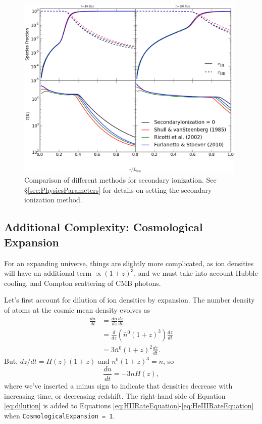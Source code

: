 \documentclass[letterpaper,titlepage,12pt]{article}
\numberwithin{equation}{section}
\begin{document}
\begin{figure}[htbp!]
\begin{center}
\includegraphics[width=0.98\textwidth]{figures/secondary_ionization_methods.eps}
\caption{Comparison of different methods for secondary ionization.  See \S\ref{sec:PhysicsParameters} for details on setting the secondary ionization method.}
\label{fig:SecondaryIonizationMethods}
\end{center}
\end{figure}

\subsection{Additional Complexity: Cosmological Expansion}
For an expanding universe, things are slightly more complicated, as ion densities will have an additional term $\propto (1 + z)^3$, and we must take into account Hubble cooling, and Compton scattering of CMB photons.

Let's first account for dilution of ion densities by expansion.  The number density of atoms at the cosmic mean density evolves as
\begin{align}
    \frac{dn}{dt} & = \frac{dn}{dz}\frac{dz}{dt} \nonumber \\
    & = \frac{d}{dz}\left(\bar{n}^0 (1 + z)^3 \right) \frac{dz}{dt} \nonumber \\
    & = 3 \bar{n}^0 (1 + z)^2 \frac{dz}{dt} .
\end{align}    
But, $dz/dt = H(z) (1 +z)$ and $\bar{n}^0 (1 + z)^3 = n$, so
\begin{equation}
    \frac{dn}{dt} = -3 n H(z) , \label{eq:dilution}
\end{equation}    
where we've inserted a minus sign to indicate that densities decrease with increasing time, or decreasing redshift.  The right-hand side of Equation \ref{eq:dilution} is added to Equations \ref{eq:HIIRateEquation}-\ref{eq:HeIIIRateEquation} when \texttt{CosmologicalExpansion = 1}.
\end{document}
